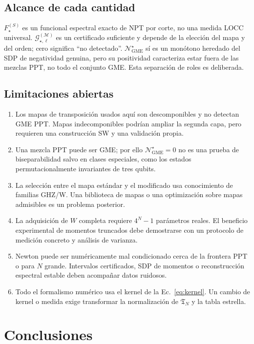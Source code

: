 \documentclass[11pt,a4paper]{article}
\newcommand{\Tfun}{\mathfrak T}
\newcommand{\Fstar}{F_{\star}}
\newcommand{\Ngstar}{\mathcal N_{\mathrm{GME}}^{\star}}
\theoremstyle{definition}
\begin{document}
\subsection{Alcance de cada cantidad}

$\Fstar^{(S)}$ es un funcional espectral exacto de NPT por corte, no una medida
LOCC universal. $\mathcal G_{\star,\ell}^{(\mathcal M)}$ es un certificado suficiente y
depende de la elección del mapa y del orden; cero significa ``no detectado''.
$\Ngstar$ sí es un monótono heredado del SDP de negatividad genuina, pero su
positividad caracteriza estar fuera de las mezclas PPT, no todo el conjunto GME.
Esta separación de roles es deliberada.

\subsection{Limitaciones abiertas}

\begin{enumerate}
\item Los mapas de transposición usados aquí son descomponibles y no detectan
GME PPT. Mapas indecomponibles podrían ampliar la segunda capa, pero requieren
una construcción SW y una validación propia.
\item Una mezcla PPT puede ser GME; por ello $\Ngstar=0$ no es una prueba de
biseparabilidad salvo en clases especiales, como los estados
permutacionalmente invariantes de tres qubits.
\item La selección entre el mapa estándar y el modificado usa conocimiento de
familias GHZ/W. Una biblioteca de mapas o una optimización sobre mapas admisibles
es un problema posterior.
\item La adquisición de $W$ completa requiere $4^N-1$ parámetros reales. El
beneficio experimental de momentos truncados debe demostrarse con un protocolo
de medición concreto y análisis de varianza.
\item Newton puede ser numéricamente mal condicionado cerca de la frontera PPT
o para $N$ grande. Intervalos certificados, SDP de momentos o reconstrucción
espectral estable deben acompañar datos ruidosos.
\item Todo el formalismo numérico usa el kernel de la Ec.~\eqref{eq:kernel}. Un
cambio de kernel o medida exige transformar la normalización de $\Tfun_N$ y la
tabla estrella.
\end{enumerate}

\section{Conclusiones}
\end{document}

